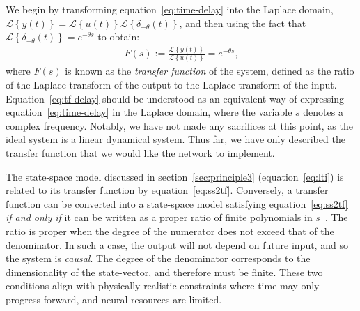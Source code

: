 We begin by transforming equation~\ref{eq:time-delay} into the Laplace domain, $\mathcal{L} \left\{ y(t) \right\} = \mathcal{L} \left\{ u(t) \right\} \mathcal{L} \left\{ \delta_{-\theta}(t) \right\}$, and then using the fact that $\mathcal{L} \left\{ \delta_{-\theta}(t) \right\} = e^{-\theta s}$ to obtain:
\begin{align} \label{eq:tf-delay}
F(s) := \frac{\mathcal{L} \left\{ y(t) \right\}}{\mathcal{L} \left\{ u(t) \right\}} = e^{-\theta s} \text{,}
\end{align}
where $F(s)$ is known as the \emph{transfer function} of the system, defined as the ratio of the Laplace transform of the output to the Laplace transform of the input.
Equation~\ref{eq:tf-delay} should be understood as an equivalent way of expressing equation~\ref{eq:time-delay} in the Laplace domain, where the variable $s$ denotes a complex frequency. 
Notably, we have not made any sacrifices at this point, as the ideal system is a linear dynamical system.
Thus far, we have only described the transfer function that we would like the network to implement. %

The state-space model discussed in section~\ref{sec:principle3} (equation~\ref{eq:lti}) is related to its transfer function by equation~\ref{eq:ss2tf}.
Conversely, a transfer function can be converted into a state-space model satisfying equation~\ref{eq:ss2tf} \emph{if and only if} it can be written as a proper ratio of finite polynomials in $s$~\citep{brogan1982modern}.
The ratio is proper when the degree of the numerator does not exceed that of the denominator.
In such a case, the output will not depend on future input, and so the system is \emph{causal}.
The degree of the denominator corresponds to the dimensionality of the state-vector, and therefore must be finite.
These two conditions align with physically realistic constraints where time may only progress forward, and neural resources are limited.

